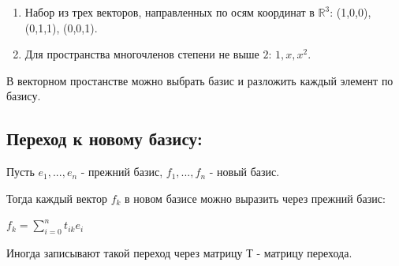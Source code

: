 \documentclass[12pt]{article}
\begin{document}
\begin{enumerate}
    \item Набор из трех векторов, направленных по осям координат в $\mathbb{R}^{3}$:
          (1,0,0), (0,1,1), (0,0,1).

    \item Для пространства многочленов степени не выше $2$: $1, x, x^{2}$.
\end{enumerate}


В векторном простанстве можно выбрать базис и разложить каждый элемент по базису.

\subsection{Переход к новому базису:}

Пусть $e_{1},...,e_{n}$ - прежний базис, $f_{1},...,f_{n}$ - новый базис.

Тогда каждый вектор $f_{k}$ в новом базисе можно выразить через прежний базис:

$f_{k} = \sum\limits_{i=0}^n t_{ik}e_{i}$

Иногда записывают такой переход через матрицу Т - матрицу перехода.
\end{document}
